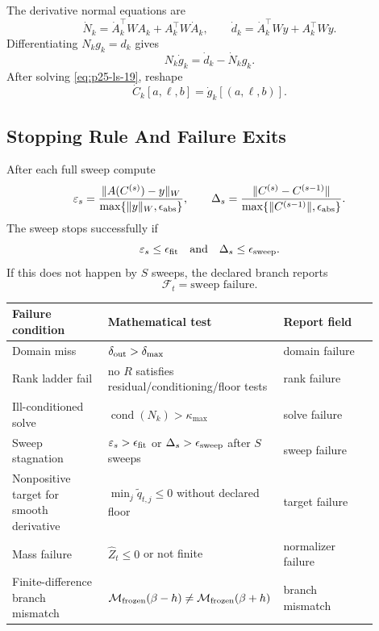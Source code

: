 \documentclass[11pt]{article}
\numberwithin{equation}{section}
\begin{document}
The derivative normal equations are
\begin{equation}
    \dot N_k
    =
    \dot A_k^\top W A_k+A_k^\top W\dot A_k,
    \qquad
    \dot d_k
    =
    \dot A_k^\top W y+A_k^\top W\dot y.
    \label{eq:p25-ls-18}
\end{equation}
Differentiating \(N_kg_k=d_k\) gives
\begin{equation}
    N_k\dot g_k=\dot d_k-\dot N_k g_k.
    \label{eq:p25-ls-19}
\end{equation}
After solving \eqref{eq:p25-ls-19}, reshape
\begin{equation}
    \dot C_k[a,\ell,b]=\dot g_k[(a,\ell,b)].
    \label{eq:p25-ls-20}
\end{equation}

\subsection{Stopping Rule And Failure Exits}

After each full sweep compute
\begin{equation}
    \varepsilon_s
    =
    \frac{\|A(C^{(s)})-y\|_W}{\max\{\|y\|_W,\epsilon_{\rm abs}\}},
    \qquad
    \Delta_s
    =
    \frac{\|C^{(s)}-C^{(s-1)}\|}{\max\{\|C^{(s-1)}\|,\epsilon_{\rm abs}\}}.
    \label{eq:p25-ls-21}
\end{equation}
The sweep stops successfully if
\begin{equation}
    \varepsilon_s\le\epsilon_{\rm fit}
    \quad\text{and}\quad
    \Delta_s\le\epsilon_{\rm sweep}.
    \label{eq:p25-ls-22}
\end{equation}
If this does not happen by \(S\) sweeps, the declared branch reports
\begin{equation}
    \mathcal F_t=\text{sweep failure}.
    \label{eq:p25-ls-23}
\end{equation}

\begin{center}
\begin{tabular}{p{0.28\linewidth}p{0.34\linewidth}p{0.28\linewidth}}
\toprule
Failure condition & Mathematical test & Report field\\
\midrule
Domain miss &
\(\delta_{\rm out}>\delta_{\max}\) &
domain failure\\
Rank ladder fail &
no \(R\) satisfies residual/conditioning/floor tests &
rank failure\\
Ill-conditioned solve &
\(\operatorname{cond}(N_k)>\kappa_{\max}\) &
solve failure\\
Sweep stagnation &
\(\varepsilon_s>\epsilon_{\rm fit}\) or \(\Delta_s>\epsilon_{\rm sweep}\) after \(S\) sweeps &
sweep failure\\
Nonpositive target for smooth derivative &
\(\min_j\widetilde q_{t,j}\le0\) without declared floor &
target failure\\
Mass failure &
\(\widehat Z_t\le0\) or not finite &
normalizer failure\\
Finite-difference branch mismatch &
\(\mathcal M_{\rm frozen}(\beta-h)\ne\mathcal M_{\rm frozen}(\beta+h)\) &
branch mismatch\\
\bottomrule
\end{tabular}
\end{center}
\end{document}
